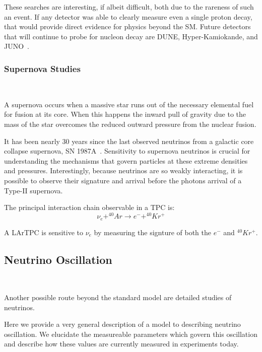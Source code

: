 These searches are interesting, if albeit difficult, both due to the rareness of such an event.
If any detector was able to clearly measure even a single proton decay, that would provide direct evidence for physics beyond the SM.
Future detectors that will continue to probe for nucleon decay are DUNE, Hyper-Kamiokande, and JUNO~\citep{DUNE_TDR_V1_Abi_2020, https://doi.org/10.48550/arxiv.1805.04163, Juno:2022103927}.

\subsubsection{Supernova Studies}~\label{sec:intro_supernova}

A supernova occurs when a massive star runs out of the necessary elemental fuel for fusion at its core.
When this happens the inward pull of gravity due to the mass of the star overcomes the reduced outward pressure from the nuclear fusion.

It has been nearly 30 years since the last observed neutrinos from a galactic core collapse supernova, SN 1987A~\citep{1987ApJ...322..795F}.
Sensitivity to supernova neutrinos is crucial for understanding the mechanisms that govern particles at these extreme densities and pressures.
Interestingly, because neutrinos are so weakly interacting, it is possible to observe their signature and arrival before the photons arrival of a Type-II supernova.

The principal interaction chain observable in a TPC is:
\begin{equation}
    \nu_{e} + ^{40}Ar \rightarrow e^- + ^{40}Kr^{+}
\end{equation}

A LArTPC is sensitive to $\nu_{e}$ by measuring the signture of both the $e^{-}$ and $^{40}Kr^{+}$.

\subsection{Neutrino Oscillation}~\label{sec:neutrino_osc}

Another possible route beyond the standard model are detailed studies of neutrinos.

Here we provide a very general description of a model to describing neutrino oscillation.
We elucidate the measureable parameters which govern this oscillation and describe how these values are currently measured in experiments today.

